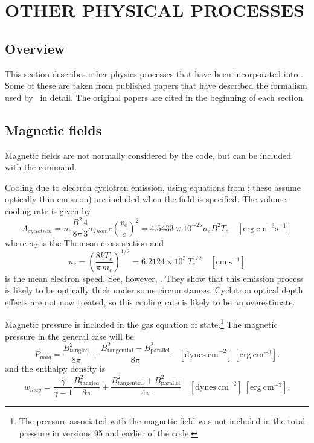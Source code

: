 \chapter{OTHER PHYSICAL PROCESSES}

\section{Overview}

This section describes other physics processes that have been incorporated
into \Cloudy.  Some of these are taken from published papers that have
described the formalism used by \Cloudy\ in detail.
The original papers are
cited in the beginning of each section.

\section{Magnetic fields}

Magnetic fields are not normally considered by the code, but can be
included with the  command.

Cooling due to electron cyclotron emission, using equations from
\citet{Fabian1976}; these assume optically thin emission) are included
when the field is specified.  The volume-cooling rate is given by
\begin{equation}
\Lambda_{cyclotron} = n_e \frac{B^2}{8\pi} \frac{4}{3}
\sigma_{Thom}c\left(\frac{v_e}{c}\right)^2= 4.5433\times 10^{-25} n_e B^2T_e
\quad [\mathrm{erg~cm}^{-3} \mathrm{s}^{-1}]
\end{equation}
where $\sigma_T$ is the Thomson cross-section and
\begin{equation}
{u_e} = {\left( {\frac{{8k{T_e}}}{{\pi \,{m_e}}}} \right)^{1/2}} = 6.2124
\times {10^5}\,T_e^{1/2}\quad
 [\mathrm{cm~s}^{-1}]
\end{equation}
is the mean electron speed.
See, however, \citet{Masters1977}.
They show that this emission process is likely to be optically
thick under some circumstances.  Cyclotron optical depth effects are not
now treated, so this cooling rate is likely to be an overestimate.

Magnetic pressure is included in the gas equation of state.\footnote{The pressure associated with the magnetic field was not included
in the total pressure in versions 95 and earlier of the code.}
The magnetic pressure  in the general case will be
\begin{equation}
{P_{mag}} = \frac{{B_{{\mathrm{tangled}}}^{\mathrm{2}}}}{{8\pi }} +
\frac{{B_{{\mathrm{tangential}}}^{\mathrm{2}} - B_{{\mathrm{parallel}}}^{\mathrm{2}}}}{{8\pi
}}\quad  [\mathrm{dynes~cm}^{-2}]\   [\mathrm{erg~cm}^{-3}].
\end{equation}
and the enthalpy density is
\begin{equation}
\label{eqn:MagneticFieldEnthalpyDensity}
{w_{mag}} = \frac{\gamma }{{\gamma  -
1}}\frac{{B_{{\mathrm{tangled}}}^{\mathrm{2}}}}{{8\pi }} +
\frac{{B_{{\mathrm{tangential}}}^{\mathrm{2}} + B_{{\mathrm{parallel}}}^{\mathrm{2}}}}{{4\pi
}}
\quad [\mathrm{dynes~cm}^{-2}]\  [\mathrm{erg~cm}^{-3}].
\end{equation}

